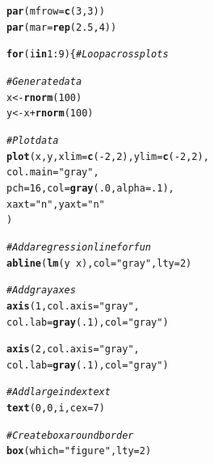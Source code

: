\documentclass{tufte-book}\usepackage[]{graphicx}\usepackage[]{color}
\makeatletter
\newcommand{\hlnum}[1]{\textcolor[rgb]{0.686,0.059,0.569}{#1}}%
\newcommand{\hlstr}[1]{\textcolor[rgb]{0.192,0.494,0.8}{#1}}%
\newcommand{\hlcom}[1]{\textcolor[rgb]{0.678,0.584,0.686}{\textit{#1}}}%
\newcommand{\hlopt}[1]{\textcolor[rgb]{0,0,0}{#1}}%
\newcommand{\hlstd}[1]{\textcolor[rgb]{0.345,0.345,0.345}{#1}}%
\newcommand{\hlkwa}[1]{\textcolor[rgb]{0.161,0.373,0.58}{\textbf{#1}}}%
\newcommand{\hlkwb}[1]{\textcolor[rgb]{0.69,0.353,0.396}{#1}}%
\newcommand{\hlkwc}[1]{\textcolor[rgb]{0.333,0.667,0.333}{#1}}%
\newcommand{\hlkwd}[1]{\textcolor[rgb]{0.737,0.353,0.396}{\textbf{#1}}}%
\newenvironment{kframe}{%
 \def\at@end@of@kframe{}%
 \ifinner\ifhmode%
  \def\at@end@of@kframe{\end{minipage}}%
  \begin{minipage}{\columnwidth}%
 \fi\fi%
 \def\FrameCommand##1{\hskip\@totalleftmargin \hskip-\fboxsep
 \colorbox{shadecolor}{##1}\hskip-\fboxsep
     \hskip-\linewidth \hskip-\@totalleftmargin \hskip\columnwidth}%
 \MakeFramed {\advance\hsize-\width
   \@totalleftmargin\z@ \linewidth\hsize
   \@setminipage}}%
 {\par\unskip\endMakeFramed%
 \at@end@of@kframe}
\newenvironment{knitrout}{}{} %
\makeatother
\begin{document}
\begin{marginfigure}
\begin{tiny}
\begin{knitrout}
\color{fgcolor}\begin{kframe}
\begin{alltt}
\hlkwd{par}\hlstd{(}\hlkwc{mfrow} \hlstd{=} \hlkwd{c}\hlstd{(}\hlnum{3}\hlstd{,} \hlnum{3}\hlstd{))}
\hlkwd{par}\hlstd{(}\hlkwc{mar} \hlstd{=} \hlkwd{rep}\hlstd{(}\hlnum{2.5}\hlstd{,} \hlnum{4}\hlstd{))}

\hlkwa{for}\hlstd{(i} \hlkwa{in} \hlnum{1}\hlopt{:}\hlnum{9}\hlstd{) \{} \hlcom{# Loop across plots}

\hlcom{# Generate data}
\hlstd{x} \hlkwb{<-} \hlkwd{rnorm}\hlstd{(}\hlnum{100}\hlstd{)}
\hlstd{y} \hlkwb{<-} \hlstd{x} \hlopt{+} \hlkwd{rnorm}\hlstd{(}\hlnum{100}\hlstd{)}

\hlcom{# Plot data}
  \hlkwd{plot}\hlstd{(x, y,} \hlkwc{xlim} \hlstd{=} \hlkwd{c}\hlstd{(}\hlopt{-}\hlnum{2}\hlstd{,} \hlnum{2}\hlstd{),} \hlkwc{ylim} \hlstd{=} \hlkwd{c}\hlstd{(}\hlopt{-}\hlnum{2}\hlstd{,} \hlnum{2}\hlstd{),}
       \hlkwc{col.main} \hlstd{=} \hlstr{"gray"}\hlstd{,}
       \hlkwc{pch} \hlstd{=} \hlnum{16}\hlstd{,} \hlkwc{col} \hlstd{=} \hlkwd{gray}\hlstd{(}\hlnum{.0}\hlstd{,} \hlkwc{alpha} \hlstd{=} \hlnum{.1}\hlstd{),}
       \hlkwc{xaxt} \hlstd{=} \hlstr{"n"}\hlstd{,} \hlkwc{yaxt} \hlstd{=} \hlstr{"n"}
       \hlstd{)}

\hlcom{# Add a regression line for fun}
\hlkwd{abline}\hlstd{(}\hlkwd{lm}\hlstd{(y} \hlopt{~} \hlstd{x),} \hlkwc{col} \hlstd{=} \hlstr{"gray"}\hlstd{,} \hlkwc{lty} \hlstd{=} \hlnum{2}\hlstd{)}


\hlcom{# Add gray axes}
\hlkwd{axis}\hlstd{(}\hlnum{1}\hlstd{,} \hlkwc{col.axis} \hlstd{=} \hlstr{"gray"}\hlstd{,}
     \hlkwc{col.lab} \hlstd{=} \hlkwd{gray}\hlstd{(}\hlnum{.1}\hlstd{),} \hlkwc{col} \hlstd{=} \hlstr{"gray"}\hlstd{)}

\hlkwd{axis}\hlstd{(}\hlnum{2}\hlstd{,} \hlkwc{col.axis} \hlstd{=} \hlstr{"gray"}\hlstd{,}
     \hlkwc{col.lab} \hlstd{=} \hlkwd{gray}\hlstd{(}\hlnum{.1}\hlstd{),} \hlkwc{col} \hlstd{=} \hlstr{"gray"}\hlstd{)}

\hlcom{# Add large index text}
\hlkwd{text}\hlstd{(}\hlnum{0}\hlstd{,} \hlnum{0}\hlstd{, i,} \hlkwc{cex} \hlstd{=} \hlnum{7}\hlstd{)}

\hlcom{# Create box around border}
\hlkwd{box}\hlstd{(}\hlkwc{which} \hlstd{=} \hlstr{"figure"}\hlstd{,} \hlkwc{lty} \hlstd{=} \hlnum{2}\hlstd{)}


\end{alltt}
\end{kframe}
\end{knitrout}
\end{tiny}
\end{marginfigure}
\end{document}
